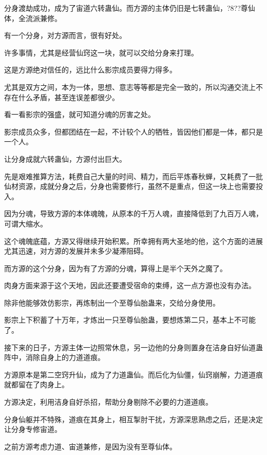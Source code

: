 
\begin{this_body}



分身渡劫成功，成为了宙道六转蛊仙。而方源的主体仍旧是七转蛊仙，?8??尊仙体，全流派兼修。

有一个分身，对方源而言，很有好处。

许多事情，尤其是经营仙窍这一块，就可以交给分身来打理。

这是方源绝对信任的，远比什么影宗成员要得力得多。

尤其是双方之间，本为一体，思想、意志等等都是完全一致的，所以沟通交流上不存在什么矛盾，甚至连误差都很少。

看一看影宗的强盛，就可知道分魂的厉害之处。

影宗成员众多，但都团结在一起，不计较个人的牺牲，皆因他们都是一体，都只是一个人。

让分身成就六转蛊仙，方源付出巨大。

先是艰难推算方法，耗费自己大量的时间、精力，而后平炼春秋蝉，又耗费了一批仙材资源，成就分身之后，分身也需要修行，虽然不是重点，但这一块上也需要投入。

因为分魂，导致方源的本体魂魄，从原本的千万人魂，直接降低到了九百万人魂，可谓大缩水。

这个魂魄底蕴，方源又得继续开始积累。所幸拥有两大圣地的他，这个方面的进展尤其迅速，对方源的发展并未多少凝滞阻碍。

而方源的这个分身，因为有了方源的分魂，算得上是半个天外之魔了。

肉身方面来源于这个天地，因此还要遭受宿命的束缚，这一点方源也没有办法。

除非他能够效仿影宗，再炼制出一个至尊仙胎蛊来，交给分身使用。

影宗上下积蓄了十万年，才炼出一只至尊仙胎蛊，要想炼第二只，基本上不可能了。

接下来的日子，方源主体一边照常休息，另一边他的分身则置身在洁身自好仙道蛊阵中，消除自身上的力道道痕。

方源原本是第二空窍升仙，成为了力道蛊仙。而后化为仙僵，仙窍崩解，力道道痕就都留在了肉身上。

方源决定，利用洁身自好杀招，帮助分身剔除不必要的力道道痕。

分身仙躯并不特殊，道痕在其身上，相互掣肘干扰，方源深思熟虑之后，还是决定让分身专修宙道。

之前方源考虑力道、宙道兼修，是因为没有至尊仙体。


\end{this_body}
